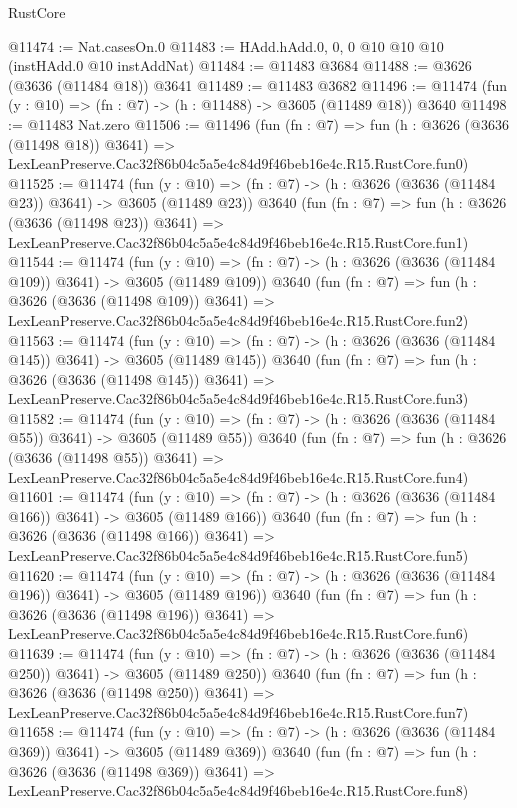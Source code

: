 \begin{lexlean}{RustCore}
\begin{coremodule}
@11474 := Nat.casesOn.{0}
@11483 := HAdd.hAdd.{0, 0, 0} @10 @10 @10 (instHAdd.{0} @10 instAddNat)
@11484 := @11483 @3684
@11488 := @3626 (@3636 (@11484 @18)) @3641
@11489 := @11483 @3682
@11496 := @11474 (fun (y : @10) => (fn : @7) -> (h : @11488) -> @3605 (@11489 @18)) @3640
@11498 := @11483 Nat.zero
@11506 := @11496
    (fun (fn : @7) =>
    fun (h : @3626 (@3636 (@11498 @18)) @3641) =>
    LexLeanPreserve.Cac32f86b04c5a5e4c84d9f46beb16e4c.R15.RustCore.fun0)
@11525 := @11474
    (fun (y : @10) => (fn : @7) -> (h : @3626 (@3636 (@11484 @23)) @3641) -> @3605 (@11489 @23))
    @3640
    (fun (fn : @7) =>
    fun (h : @3626 (@3636 (@11498 @23)) @3641) =>
    LexLeanPreserve.Cac32f86b04c5a5e4c84d9f46beb16e4c.R15.RustCore.fun1)
@11544 := @11474
    (fun (y : @10) => (fn : @7) -> (h : @3626 (@3636 (@11484 @109)) @3641) -> @3605 (@11489 @109))
    @3640
    (fun (fn : @7) =>
    fun (h : @3626 (@3636 (@11498 @109)) @3641) =>
    LexLeanPreserve.Cac32f86b04c5a5e4c84d9f46beb16e4c.R15.RustCore.fun2)
@11563 := @11474
    (fun (y : @10) => (fn : @7) -> (h : @3626 (@3636 (@11484 @145)) @3641) -> @3605 (@11489 @145))
    @3640
    (fun (fn : @7) =>
    fun (h : @3626 (@3636 (@11498 @145)) @3641) =>
    LexLeanPreserve.Cac32f86b04c5a5e4c84d9f46beb16e4c.R15.RustCore.fun3)
@11582 := @11474
    (fun (y : @10) => (fn : @7) -> (h : @3626 (@3636 (@11484 @55)) @3641) -> @3605 (@11489 @55))
    @3640
    (fun (fn : @7) =>
    fun (h : @3626 (@3636 (@11498 @55)) @3641) =>
    LexLeanPreserve.Cac32f86b04c5a5e4c84d9f46beb16e4c.R15.RustCore.fun4)
@11601 := @11474
    (fun (y : @10) => (fn : @7) -> (h : @3626 (@3636 (@11484 @166)) @3641) -> @3605 (@11489 @166))
    @3640
    (fun (fn : @7) =>
    fun (h : @3626 (@3636 (@11498 @166)) @3641) =>
    LexLeanPreserve.Cac32f86b04c5a5e4c84d9f46beb16e4c.R15.RustCore.fun5)
@11620 := @11474
    (fun (y : @10) => (fn : @7) -> (h : @3626 (@3636 (@11484 @196)) @3641) -> @3605 (@11489 @196))
    @3640
    (fun (fn : @7) =>
    fun (h : @3626 (@3636 (@11498 @196)) @3641) =>
    LexLeanPreserve.Cac32f86b04c5a5e4c84d9f46beb16e4c.R15.RustCore.fun6)
@11639 := @11474
    (fun (y : @10) => (fn : @7) -> (h : @3626 (@3636 (@11484 @250)) @3641) -> @3605 (@11489 @250))
    @3640
    (fun (fn : @7) =>
    fun (h : @3626 (@3636 (@11498 @250)) @3641) =>
    LexLeanPreserve.Cac32f86b04c5a5e4c84d9f46beb16e4c.R15.RustCore.fun7)
@11658 := @11474
    (fun (y : @10) => (fn : @7) -> (h : @3626 (@3636 (@11484 @369)) @3641) -> @3605 (@11489 @369))
    @3640
    (fun (fn : @7) =>
    fun (h : @3626 (@3636 (@11498 @369)) @3641) =>
    LexLeanPreserve.Cac32f86b04c5a5e4c84d9f46beb16e4c.R15.RustCore.fun8)

\end{coremodule}
\end{lexlean}
